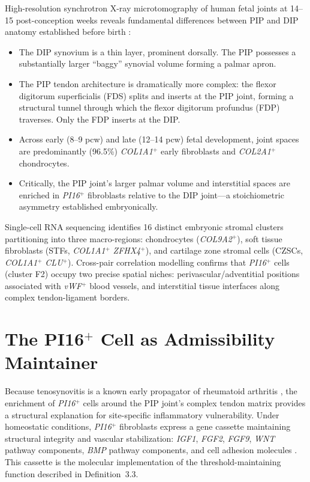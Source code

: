 \documentclass[12pt, a4paper, twoside]{book}
\theoremstyle{definition}
\theoremstyle{remark}
\newcommand{\gene}[1]{\textit{#1}}
\begin{document}
High-resolution synchrotron X-ray microtomography of human fetal joints at 14--15 post-conception weeks reveals fundamental differences between PIP and DIP anatomy established before birth \citep{davidson2026}:

\begin{itemize}
  \item The DIP synovium is a thin layer, prominent dorsally. The PIP possesses a substantially larger ``baggy'' synovial volume forming a palmar apron.
  \item The PIP tendon architecture is dramatically more complex: the flexor digitorum superficialis (FDS) splits and inserts at the PIP joint, forming a structural tunnel through which the flexor digitorum profundus (FDP) traverses. Only the FDP inserts at the DIP.
  \item Across early (8--9 pcw) and late (12--14 pcw) fetal development, joint spaces are predominantly (96.5\%) \gene{COL1A1}$^+$ early fibroblasts and \gene{COL2A1}$^+$ chondrocytes.
  \item Critically, the PIP joint's larger palmar volume and interstitial spaces are enriched in \gene{PI16}$^+$ fibroblasts relative to the DIP joint---a stoichiometric asymmetry established embryonically.
\end{itemize}

Single-cell RNA sequencing identifies 16 distinct embryonic stromal clusters partitioning into three macro-regions: chondrocytes (\gene{COL9A2}$^+$), soft tissue fibroblasts (STFs, \gene{COL1A1}$^+$ \gene{ZFHX4}$^+$), and cartilage zone stromal cells (CZSCs, \gene{COL1A1}$^+$ \gene{CLU}$^+$). Cross-pair correlation modelling confirms that \gene{PI16}$^+$ cells (cluster F2) occupy two precise spatial niches: perivascular/adventitial positions associated with \gene{vWF}$^+$ blood vessels, and interstitial tissue interfaces along complex tendon-ligament borders.

\section{The PI16$^+$ Cell as Admissibility Maintainer}

Because tenosynovitis is a known early propagator of rheumatoid arthritis \citep{buckley2019}, the enrichment of \gene{PI16}$^+$ cells around the PIP joint's complex tendon matrix provides a structural explanation for site-specific inflammatory vulnerability. Under homeostatic conditions, \gene{PI16}$^+$ fibroblasts express a gene cassette maintaining structural integrity and vascular stabilization: \gene{IGF1}, \gene{FGF2}, \gene{FGF9}, \gene{WNT} pathway components, \gene{BMP} pathway components, and cell adhesion molecules \citep{davidson2026}. This cassette is the molecular implementation of the threshold-maintaining function described in Definition~3.3.
\end{document}
